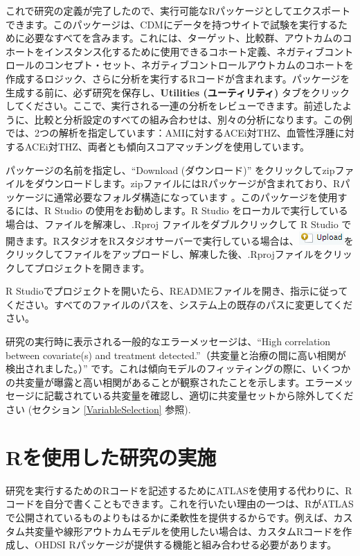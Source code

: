 \documentclass[
  11pt]{book}
\theoremstyle{definition}
\theoremstyle{definition}
\theoremstyle{definition}
\theoremstyle{definition}
\theoremstyle{remark}
\begin{document}
これで研究の定義が完了したので、実行可能なRパッケージとしてエクスポートできます。このパッケージは、CDMにデータを持つサイトで試験を実行するために必要なすべてを含みます。これには、ターゲット、比較群、アウトカムのコホートをインスタンス化するために使用できるコホート定義、ネガティブコントロールのコンセプト・セット、ネガティブコントロールアウトカムのコホートを作成するロジック、さらに分析を実行するRコードが含まれます。パッケージを生成する前に、必ず研究を保存し、\textbf{Utilities (ユーティリティ)} タブをクリックしてください。ここで、実行される一連の分析をレビューできます。前述したように、比較と分析設定のすべての組み合わせは、別々の分析になります。この例では、2つの解析を指定しています：AMIに対するACEi対THZ、血管性浮腫に対するACEi対THZ、両者とも傾向スコアマッチングを使用しています。

パッケージの名前を指定し、``Download (ダウンロード)'' をクリックしてzipファイルをダウンロードします。zipファイルにはRパッケージが含まれており、Rパッケージに通常必要なフォルダ構造になっています \citep{Wickham_2015}。このパッケージを使用するには、R Studio の使用をお勧めします。R Studio をローカルで実行している場合は、ファイルを解凍し、.Rproj ファイルをダブルクリックして R Studio で開きます。RスタジオをRスタジオサーバーで実行している場合は、\includegraphics{images/PopulationLevelEstimation/upload.png}をクリックしてファイルをアップロードし、解凍した後、.Rprojファイルをクリックしてプロジェクトを開きます。

R Studioでプロジェクトを開いたら、READMEファイルを開き、指示に従ってください。すべてのファイルのパスを、システム上の既存のパスに変更してください。

研究の実行時に表示される一般的なエラーメッセージは、``High correlation between covariate(s) and treatment detected.''（共変量と治療の間に高い相関が検出されました。）'' です。これは傾向モデルのフィッティングの際に、いくつかの共変量が曝露と高い相関があることが観察されたことを示します。エラーメッセージに記載されている共変量を確認し、適切に共変量セットから除外してください (セクション \ref{VariableSelection} 参照). 

\section{Rを使用した研究の実施}\label{pleR}

研究を実行するためのRコードを記述するためにATLASを使用する代わりに、Rコードを自分で書くこともできます。これを行いたい理由の一つは、RがATLASで公開されているものよりもはるかに柔軟性を提供するからです。例えば、カスタム共変量や線形アウトカムモデルを使用したい場合は、カスタムRコードを作成し、OHDSI Rパッケージが提供する機能と組み合わせる必要があります。
\end{document}
